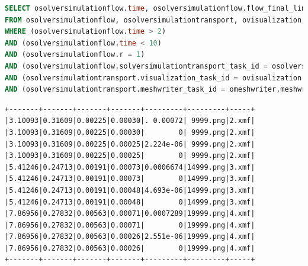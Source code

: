 \begin{lstlisting}[language=sql,deletendkeywords={TIME},deletendkeywords={TIME},label={lst:experiments-3a-sql},caption={[Código em SQL gerado na consulta~\#3A]Código em SQL gerado na consulta~\#3A. Tempo médio de geração: 31,80~ms.}]
SELECT osolversimulationflow.time, osolversimulationflow.flow_final_linear_residual, osolversimulationflow.flow_norm_delta_u, osolversimulationtransport.transport_final_linear_residual, osolversimulationtransport.transport_norm_delta_u, ovisualization.png, omeshwriter.xdmf
FROM osolversimulationflow, osolversimulationtransport, ovisualization, omeshwriter
WHERE (osolversimulationflow.time > 2) 
AND (osolversimulationflow.time < 10) 
AND (osolversimulationflow.r = 1) 
AND (osolversimulationflow.solversimulationtransport_task_id = osolversimulationtransport.solversimulationtransport_task_id) 
AND (osolversimulationtransport.visualization_task_id = ovisualization.visualization_task_id) 
AND (osolversimulationtransport.meshwriter_task_id = omeshwriter.meshwriter_task_id);
\end{lstlisting}

\begin{lstlisting}[language=sqlresults,label={lst:experiments-3a-sqlresults},caption={[Versão simplificada dos resultados da consulta \#3A.]Resultados da consulta \#3A. Tempo médio de execução: 5,11~ms.}]
+-------+-------+-------+-------+---------+---------+-----+
|3.10093|0.31609|0.00225|0.00030|. 0.00072| 9999.png|2.xmf|
|3.10093|0.31609|0.00225|0.00030|        0| 9999.png|2.xmf|
|3.10093|0.31609|0.00225|0.00025|2.224e-06| 9999.png|2.xmf|
|3.10093|0.31609|0.00225|0.00025|        0| 9999.png|2.xmf|
|5.41246|0.24713|0.00191|0.00073|0.0006674|14999.png|3.xmf|
|5.41246|0.24713|0.00191|0.00073|        0|14999.png|3.xmf|
|5.41246|0.24713|0.00191|0.00048|4.693e-06|14999.png|3.xmf|
|5.41246|0.24713|0.00191|0.00048|        0|14999.png|3.xmf|
|7.86956|0.27832|0.00563|0.00071|0.0007289|19999.png|4.xmf|
|7.86956|0.27832|0.00563|0.00071|        0|19999.png|4.xmf|
|7.86956|0.27832|0.00563|0.00026|2.551e-06|19999.png|4.xmf|
|7.86956|0.27832|0.00563|0.00026|        0|19999.png|4.xmf|
+-------+-------+-------+-------+---------+---------+-----+
\end{lstlisting}


